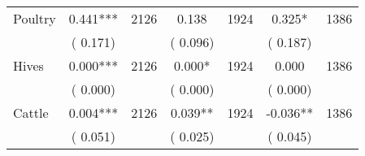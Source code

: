 \begin{tabular}{l*{6}{c}}
Poultry        &              0.441***      &       2126       &              0.138      &       1924       &              0.325*      &       1386       \\
                       &       (       0.171)            &                               &       (       0.096)            &                               &       (       0.187)            &                               \\
Hives        &              0.000***      &       2126       &              0.000*      &       1924       &              0.000      &       1386       \\
                       &       (       0.000)            &                               &       (       0.000)            &                               &       (       0.000)            &                               \\
Cattle        &              0.004***      &       2126       &              0.039**      &       1924       &             -0.036**      &       1386       \\
                       &       (       0.051)            &                               &       (       0.025)            &                               &       (       0.045)            &                               \\
\hline \end{tabular}